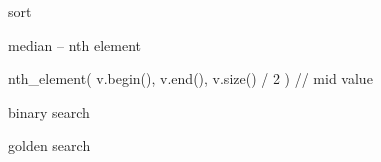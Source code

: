 \categorycontents{}

\begin{algorithm}{sort}
\end{algorithm}

\begin{algorithm}{median -- nth element}
  \begin{example}
	nth_element( v.begin(), v.end(), v.size() / 2 ) // mid value
  \end{example}
\end{algorithm}
\begin{algorithm}{binary search}
\end{algorithm}
\begin{algorithm}{golden search}
\end{algorithm}

\begin{sourceslandscape}
\end{sourceslandscape}
